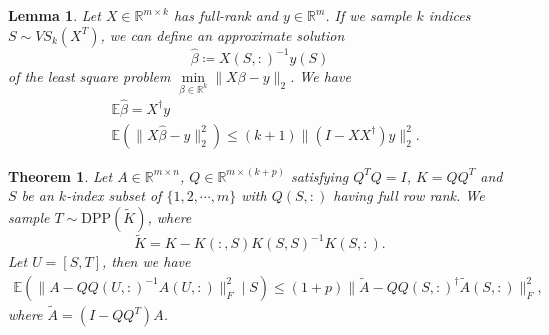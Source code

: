 \documentclass[11pt]{article}
\newtheorem{theorem}{Theorem}[section]
\newtheorem{lemma}{Lemma}[section]
\newcommand{\be}{\begin{eqnarray}}
\newcommand{\ee}{\end{eqnarray}}
\newcommand{\R}{\mathbb{R}}
\newcommand{\<}{\langle}
\renewcommand{\>}{\rangle}
\begin{document}
\begin{lemma}
\label{lma:dpp_lsq}
    Let $X\in \R^{m\times k}$ has full-rank and $y\in \R^m$. If we sample $k$ indices $S\sim VS_k(X^T)$, we can define an approximate solution
    $$\widehat \beta \coloneqq X(S, :)^{-1}y(S)$$ of the least square problem $\min\limits_{\beta \in \R^{k}} \|X\beta - y \|_2$. We have
    \be
        &\mathbb{E} \widehat \beta = X^{\dagger}y\\
        &\mathbb{E} (\|X \widehat \beta - y \|_2^2) \leq (k+1) \|(I - XX^{\dagger})y\|_2^2.
    \ee
\end{lemma}

\begin{theorem}
\label{thm:main_result_for_conditionalDPP}
Let $A \in \mathbb{R}^{m \times n}$, $Q \in \mathbb{R}^{m \times (k+p)}$ satisfying $Q^TQ = I$, $K = QQ^T$ and $S$ be an $k$-index subset of $\{1,2,\cdots,m\}$ with $Q(S,:)$ having full row rank. We sample $T\sim \mathrm{DPP}(\widetilde K)$,
    where
    \[
    \widetilde K = K - K(:,S) K(S,S)^{-1} K(S,:).
\]
Let $U = [S, T]$, then we have
\be
\mathbb{E}\!\left( \| A - QQ(U,:)^{-1} A(U,:) \|_F^2  \mid S \right)
\leq (1+p) \| \widetilde{A} - QQ(S,:)^{\dagger}\widetilde{A}(S,:) \|_F^2,
\ee
where $\widetilde A = (I - QQ^T)A$.
\end{theorem}
\end{document}
